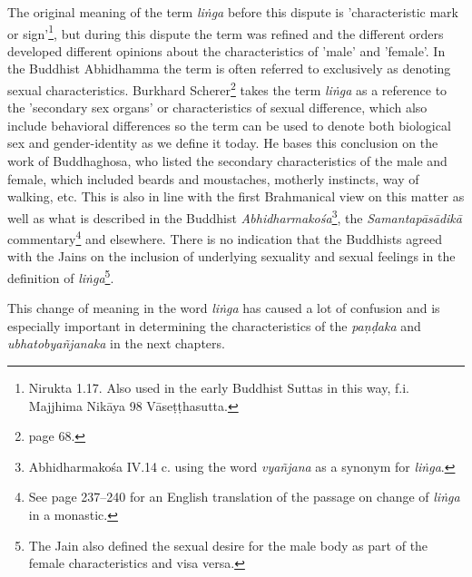 The original meaning of the term {\em liṅga} before this dispute is 'characteristic mark or sign'\footnote{Nirukta 1.17. Also used in the early Buddhist Suttas in this way, f.i. Majjhima Nikāya 98 Vāseṭṭhasutta.}, but during this dispute the term was refined and the different orders developed different opinions about the characteristics of 'male' and 'female'. In the Buddhist Abhidhamma the term is often referred to exclusively as denoting sexual characteristics. Burkhard Scherer\footnote{\cite{scherer} page 68.} takes the term {\em liṅga} as a reference to the 'secondary sex organs' or characteristics of sexual difference, which also include behavioral differences so the term can be used to denote both biological sex and gender-identity as we define it today. He bases this conclusion on the work of Buddhaghosa, who listed the secondary characteristics of the male and female, which included beards and moustaches, motherly instincts, way of walking, etc. This is also in line with the first Brahmanical view on this matter as well as what is described in the Buddhist {\em Abhidharmakośa}\footnote{Abhidharmakośa IV.14 c. using the word {\em vyañjana} as a synonym for {\em liṅga}.}, the {\em Samantapāsādikā} commentary\footnote{See \cite{anderson2016} page 237–240 for an English translation of the passage on change of {\em liṅga} in a monastic.} and elsewhere. There is no indication that the Buddhists agreed with the Jains on the inclusion of underlying sexuality and sexual feelings in the definition of {\em liṅga}\footnote{The Jain also defined the sexual desire for the male body as part of the female characteristics and visa versa.}.

This change of meaning in the word {\em liṅga} has caused a lot of confusion and is especially important in determining the characteristics of the {\em paṇḍaka} and {\em ubhatob­yañ­janaka} in the next chapters.
